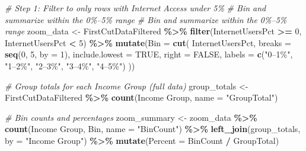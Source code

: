 \documentclass[
]{article}
\newenvironment{Shaded}{\begin{snugshade}}{\end{snugshade}}
\newcommand{\AttributeTok}[1]{\textcolor[rgb]{0.13,0.29,0.53}{#1}}
\newcommand{\CommentTok}[1]{\textcolor[rgb]{0.56,0.35,0.01}{\textit{#1}}}
\newcommand{\ConstantTok}[1]{\textcolor[rgb]{0.56,0.35,0.01}{#1}}
\newcommand{\DecValTok}[1]{\textcolor[rgb]{0.00,0.00,0.81}{#1}}
\newcommand{\FunctionTok}[1]{\textcolor[rgb]{0.13,0.29,0.53}{\textbf{#1}}}
\newcommand{\NormalTok}[1]{#1}
\newcommand{\OtherTok}[1]{\textcolor[rgb]{0.56,0.35,0.01}{#1}}
\newcommand{\SpecialCharTok}[1]{\textcolor[rgb]{0.81,0.36,0.00}{\textbf{#1}}}
\newcommand{\StringTok}[1]{\textcolor[rgb]{0.31,0.60,0.02}{#1}}
\begin{document}
\begin{Shaded}
\begin{Highlighting}[]
\CommentTok{\# Step 1: Filter to only rows with Internet Access under 5\%}
\CommentTok{\# Bin and summarize within the 0\%–5\% range}
\CommentTok{\# Bin and summarize within the 0\%–5\% range}
\NormalTok{zoom\_data }\OtherTok{\textless{}{-}}\NormalTok{ FirstCutDataFiltered }\SpecialCharTok{\%\textgreater{}\%}
  \FunctionTok{filter}\NormalTok{(InternetUsersPct }\SpecialCharTok{\textgreater{}=} \DecValTok{0}\NormalTok{, InternetUsersPct }\SpecialCharTok{\textless{}} \DecValTok{5}\NormalTok{) }\SpecialCharTok{\%\textgreater{}\%}
  \FunctionTok{mutate}\NormalTok{(}\AttributeTok{Bin =} \FunctionTok{cut}\NormalTok{(}
\NormalTok{    InternetUsersPct,}
    \AttributeTok{breaks =} \FunctionTok{seq}\NormalTok{(}\DecValTok{0}\NormalTok{, }\DecValTok{5}\NormalTok{, }\AttributeTok{by =} \DecValTok{1}\NormalTok{),}
    \AttributeTok{include.lowest =} \ConstantTok{TRUE}\NormalTok{,}
    \AttributeTok{right =} \ConstantTok{FALSE}\NormalTok{,}
    \AttributeTok{labels =} \FunctionTok{c}\NormalTok{(}\StringTok{"0–1\%"}\NormalTok{, }\StringTok{"1–2\%"}\NormalTok{, }\StringTok{"2–3\%"}\NormalTok{, }\StringTok{"3–4\%"}\NormalTok{, }\StringTok{"4–5\%"}\NormalTok{)}
\NormalTok{  ))}

\CommentTok{\# Group totals for each Income Group (full data)}
\NormalTok{group\_totals }\OtherTok{\textless{}{-}}\NormalTok{ FirstCutDataFiltered }\SpecialCharTok{\%\textgreater{}\%}
  \FunctionTok{count}\NormalTok{(}\StringTok{\textasciigrave{}}\AttributeTok{Income Group}\StringTok{\textasciigrave{}}\NormalTok{, }\AttributeTok{name =} \StringTok{"GroupTotal"}\NormalTok{)}

\CommentTok{\# Bin counts and percentages}
\NormalTok{zoom\_summary }\OtherTok{\textless{}{-}}\NormalTok{ zoom\_data }\SpecialCharTok{\%\textgreater{}\%}
  \FunctionTok{count}\NormalTok{(}\StringTok{\textasciigrave{}}\AttributeTok{Income Group}\StringTok{\textasciigrave{}}\NormalTok{, Bin, }\AttributeTok{name =} \StringTok{"BinCount"}\NormalTok{) }\SpecialCharTok{\%\textgreater{}\%}
  \FunctionTok{left\_join}\NormalTok{(group\_totals, }\AttributeTok{by =} \StringTok{"Income Group"}\NormalTok{) }\SpecialCharTok{\%\textgreater{}\%}
  \FunctionTok{mutate}\NormalTok{(}\AttributeTok{Percent =}\NormalTok{ BinCount }\SpecialCharTok{/}\NormalTok{ GroupTotal)}


\end{Highlighting}
\end{Shaded}
\end{document}
